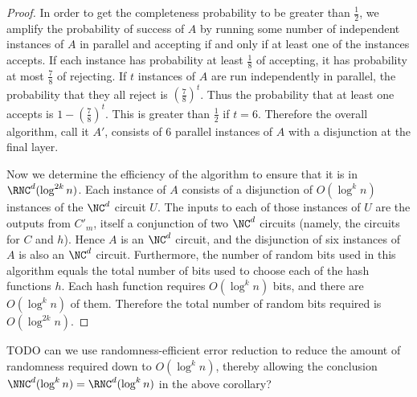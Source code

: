 \documentclass{article}
\begin{document}
\begin{proof}
  In order to get the completeness probability to be greater than $\frac{1}{2}$, we amplify the probability of success of $A$ by running some number of independent instances of $A$ in parallel and accepting if and only if at least one of the instances accepts.
  If each instance has probability at least $\frac{1}{8}$ of accepting, it has probability at most $\frac{7}{8}$ of rejecting.
  If $t$ instances of $A$ are run independently in parallel, the probability that they all reject is $(\frac{7}{8})^t$.
  Thus the probability that at least one accepts is $1 - (\frac{7}{8})^t$.
  This is greater than $\frac{1}{2}$ if $t = 6$.
  Therefore the overall algorithm, call it $A'$, consists of 6 parallel instances of $A$ with a disjunction at the final layer.

  Now we determine the efficiency of the algorithm to ensure that it is in $\RNC^d(\log^{2k} n)$.
  Each instance of $A$ consists of a disjunction of $O(\log^k n)$ instances of the $\NC^d$ circuit $U$.
  The inputs to each of those instances of $U$ are the outputs from $C'_m$, itself a conjunction of two $\NC^d$ circuits (namely, the circuits for $C$ and $h$).
  Hence $A$ is an $\NC^d$ circuit, and the disjunction of six instances of $A$ is also an $\NC^d$ circuit.
  Furthermore, the number of random bits used in this algorithm equals the total number of bits used to choose each of the hash functions $h$.
  Each hash function requires $O(\log^k n)$ bits, and there are $O(\log^k n)$ of them.
  Therefore the total number of random bits required is $O(\log^{2k} n)$.
\end{proof}

TODO can we use randomness-efficient error reduction to reduce the amount of randomness required down to $O(\log^k n)$, thereby allowing the conclusion $\NNC^d(\log^k n) = \RNC^d(\log^k n)$ in the above corollary?
\end{document}
